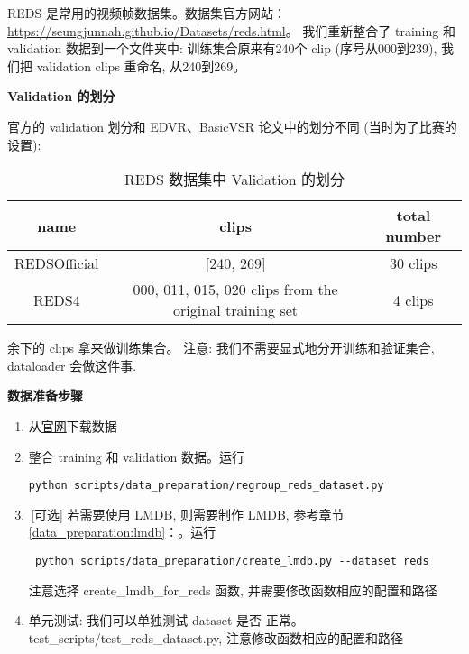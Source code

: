 \documentclass[../main.tex]{subfiles}
\begin{document}
REDS 是常用的视频帧数据集。数据集官方网站：\url{https://seungjunnah.github.io/Datasets/reds.html}。
我们重新整合了 training 和 validation 数据到一个文件夹中: 训练集合原来有240个 clip (序号从000到239), 我们把 validation clips 重命名, 从240到269。

\noindent\textbf{Validation 的划分}

官方的 validation 划分和 EDVR、BasicVSR 论文中的划分不同 (当时为了比赛的设置):

\begin{table}[h]
    \centering
    \begin{tabular}{|c|c|c|}
        \hline
        \textbf{name} & \textbf{clips}                                          & \textbf{total number} \\ \hline
        REDSOfficial  & [240, 269]                                              & 30 clips              \\ \hline
        REDS4         & 000, 011, 015, 020 clips from the original training set & 4 clips               \\ \hline
    \end{tabular}
    \caption{REDS 数据集中 Validation 的划分}
\end{table}
余下的 clips 拿来做训练集合。 注意: 我们不需要显式地分开训练和验证集合, dataloader 会做这件事.

\noindent\textbf{数据准备步骤}

\begin{enumerate}
    \item 从\href{https://seungjunnah.github.io/Datasets/reds.html}{官网}下载数据
    \item 整合 training 和 validation 数据。运行
    \begin{verbatim}
python scripts/data_preparation/regroup_reds_dataset.py
\end{verbatim}
    \item\,[可选] 若需要使用 LMDB, 则需要制作 LMDB, 参考章节\ref{data_preparation:lmdb}：。运行
    \begin{verbatim}
 python scripts/data_preparation/create_lmdb.py --dataset reds
\end{verbatim}
    注意选择 create\_lmdb\_for\_reds 函数, 并需要修改函数相应的配置和路径
    \item 单元测试: 我们可以单独测试 dataset 是否 正常。test\_scripts/test\_reds\_dataset.py, 注意修改函数相应的配置和路径
\end{enumerate}
\end{document}
